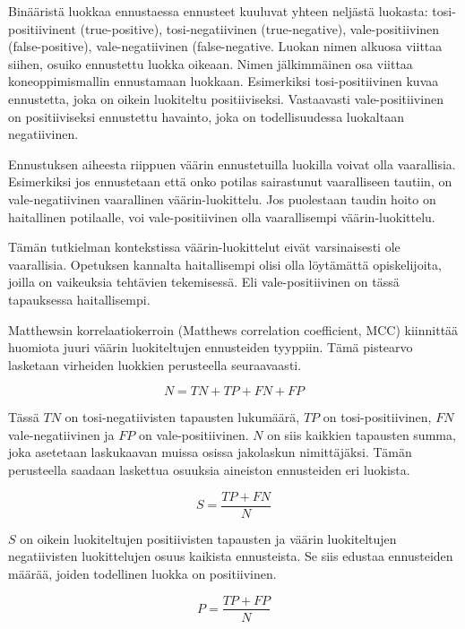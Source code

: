 \documentclass[finnish,twoside,openright]{HYgraduMLDS}
\begin{document}
Binääristä luokkaa ennustaessa ennusteet kuuluvat yhteen neljästä luokasta: tosi-positiivinent (true-positive), tosi-negatiivinen (true-negative), vale-positiivinen (false-positive), vale-negatiivinen (false-negative.  Luokan nimen alkuosa viittaa siihen, osuiko ennustettu luokka oikeaan. Nimen jälkimmäinen osa viittaa koneoppimismallin ennustamaan luokkaan. Esimerkiksi tosi-positiivinen kuvaa ennustetta, joka on oikein luokiteltu positiiviseksi. Vastaavasti vale-positiivinen on positiiviseksi ennustettu havainto, joka on todellisuudessa luokaltaan negatiivinen.

Ennustuksen aiheesta riippuen väärin ennustetuilla luokilla voivat olla vaarallisia. Esimerkiksi jos ennustetaan että onko potilas sairastunut vaaralliseen tautiin, on vale-negatiivinen vaarallinen väärin-luokittelu. Jos puolestaan taudin hoito on haitallinen potilaalle, voi vale-positiivinen olla vaarallisempi väärin-luokittelu.

Tämän tutkielman kontekstissa väärin-luokittelut eivät varsinaisesti ole vaarallisia. Opetuksen kannalta haitallisempi olisi olla löytämättä opiskelijoita, joilla on vaikeuksia tehtävien tekemisessä. Eli vale-positiivinen on tässä tapauksessa haitallisempi.

Matthewsin korrelaatiokerroin (Matthews correlation coefficient, MCC) \cite{MATTHEWS1975442} kiinnittää huomiota juuri väärin luokiteltujen ennusteiden tyyppiin. Tämä pistearvo lasketaan virheiden luokkien perusteella seuraavaasti.

\begin{equation}
    N = TN + TP + FN + FP
\end{equation}

Tässä $TN$ on tosi-negatiivisten tapausten lukumäärä, $TP$ on tosi-positiivinen, $FN$ vale-negatiivinen ja $FP$ on vale-positiivinen. $N$ on siis kaikkien tapausten summa, joka asetetaan laskukaavan muissa osissa jakolaskun nimittäjäksi. Tämän perusteella saadaan laskettua osuuksia aineiston ennusteiden eri luokista.

\begin{equation} \label{eq:mcc-s}
    S = \frac{TP + FN}{N}
\end{equation}

$S$ on oikein luokiteltujen positiivisten tapausten ja väärin luokiteltujen negatiivisten luokittelujen osuus kaikista ennusteista. Se siis edustaa ennusteiden määrää, joiden todellinen luokka on positiivinen.

\begin{equation} \label{eq:mcc-p}
    P = \frac{TP + FP}{N}
\end{equation}
\end{document}

